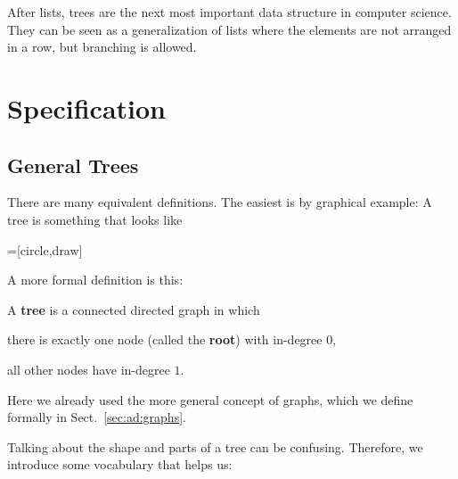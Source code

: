 After lists, trees are the next most important data structure in computer science.
They can be seen as a generalization of lists where the elements are not arranged in a row, but branching is allowed.

\section{Specification}

\subsection{General Trees}

There are many equivalent definitions.
The easiest is by graphical example: A tree is something that looks like

=[circle,draw]
\begin{center}
\end{center}

A more formal definition is this:

\begin{definition}[Tree]\label{def:ad:tree}
A \textbf{tree} is a connected directed graph in which
\begin{compactitem}
 \item there is exactly one node (called the \textbf{root}) with in-degree $0$,
 \item all other nodes have in-degree $1$.
\end{compactitem}
\end{definition}
Here we already used the more general concept of graphs, which we define formally in Sect.~\ref{sec:ad:graphs}.

Talking about the shape and parts of a tree can be confusing.
Therefore, we introduce some vocabulary that helps us:

